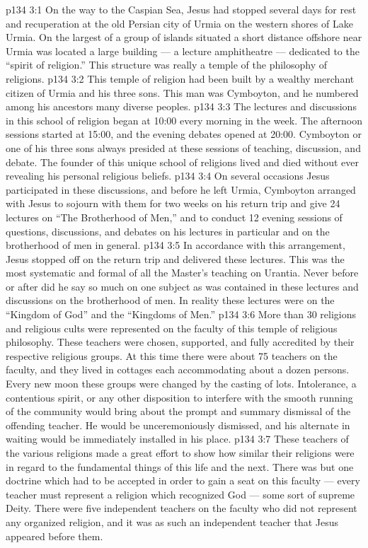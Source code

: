 \vs p134 3:1 On the way to the Caspian Sea, Jesus had stopped several days for rest and recuperation at the old Persian city of Urmia on the western shores of Lake Urmia. On the largest of a group of islands situated a short distance offshore near Urmia was located a large building --- a lecture amphitheatre --- dedicated to the “spirit of religion.” This structure was really a temple of the philosophy of religions.
\vs p134 3:2 This temple of religion had been built by a wealthy merchant citizen of Urmia and his three sons. This man was Cymboyton, and he numbered among his ancestors many diverse peoples.
\vs p134 3:3 The lectures and discussions in this school of religion began at 10:00 every morning in the week. The afternoon sessions started at 15:00, and the evening debates opened at 20:00. Cymboyton or one of his three sons always presided at these sessions of teaching, discussion, and debate. The founder of this unique school of religions lived and died without ever revealing his personal religious beliefs.
\vs p134 3:4 On several occasions Jesus participated in these discussions, and before he left Urmia, Cymboyton arranged with Jesus to sojourn with them for two weeks on his return trip and give 24 lectures on “The Brotherhood of Men,” and to conduct 12 evening sessions of questions, discussions, and debates on his lectures in particular and on the brotherhood of men in general.
\vs p134 3:5 In accordance with this arrangement, Jesus stopped off on the return trip and delivered these lectures. This was the most systematic and formal of all the Master’s teaching on Urantia. Never before or after did he say so much on one subject as was contained in these lectures and discussions on the brotherhood of men. In reality these lectures were on the “Kingdom of God” and the “Kingdoms of Men.”
\vs p134 3:6 More than 30 religions and religious cults were represented on the faculty of this temple of religious philosophy. These teachers were chosen, supported, and fully accredited by their respective religious groups. At this time there were about 75 teachers on the faculty, and they lived in cottages each accommodating about a dozen persons. Every new moon these groups were changed by the casting of lots. Intolerance, a contentious spirit, or any other disposition to interfere with the smooth running of the community would bring about the prompt and summary dismissal of the offending teacher. He would be unceremoniously dismissed, and his alternate in waiting would be immediately installed in his place.
\vs p134 3:7 These teachers of the various religions made a great effort to show how similar their religions were in regard to the fundamental things of this life and the next. There was but one doctrine which had to be accepted in order to gain a seat on this faculty --- every teacher must represent a religion which recognized God --- some sort of supreme Deity. There were five independent teachers on the faculty who did not represent any organized religion, and it was as such an independent teacher that Jesus appeared before them.
